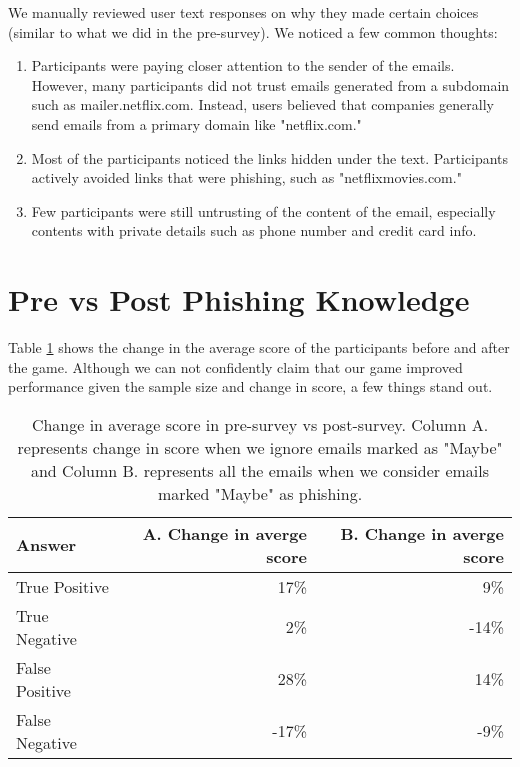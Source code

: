 We manually reviewed user text responses on why they made certain choices (similar to what we did in the pre-survey). We noticed a few common thoughts:

\begin{enumerate}
    \item Participants were paying closer attention to the sender of the emails. However, many participants did not trust emails generated from a subdomain such as mailer.netflix.com. Instead, users believed that companies generally send emails from a primary domain like "netflix.com."
    \item Most of the participants noticed the links hidden under the text. Participants actively avoided links that were phishing, such as "netflixmovies.com."
    \item Few participants were still untrusting of the content of the email, especially contents with private details such as phone number and credit card info.
\end{enumerate}

\section{Pre vs Post Phishing Knowledge}
Table \ref{tab:pre_vs_post} shows the change in the average score of the participants before and after the game. Although we can not confidently claim that our game improved performance given the sample size and change in score, a few things stand out.

\begin{table}[!ht]
    \centering
    \begin{tabular}{l r r}
        \hline
        \textbf{Answer} & \textbf{A. Change in averge score} & \textbf{B. Change in averge score} \\
        \hline
        True Positive   & 17\%                               & 9\%                                \\
        True Negative   & 2\%                                & -14\%                              \\
        False Positive  & 28\%                               & 14\%                               \\
        False Negative  & -17\%                              & -9\%                               \\
        \hline
    \end{tabular}
    \caption[Change in average score in pre-survey vs post-survey]{Change in average score in pre-survey vs post-survey. Column A. represents change in score when we ignore emails marked as "Maybe" and Column B. represents all the emails when we consider emails marked "Maybe" as phishing.}
    \label{tab:pre_vs_post}
\end{table}

